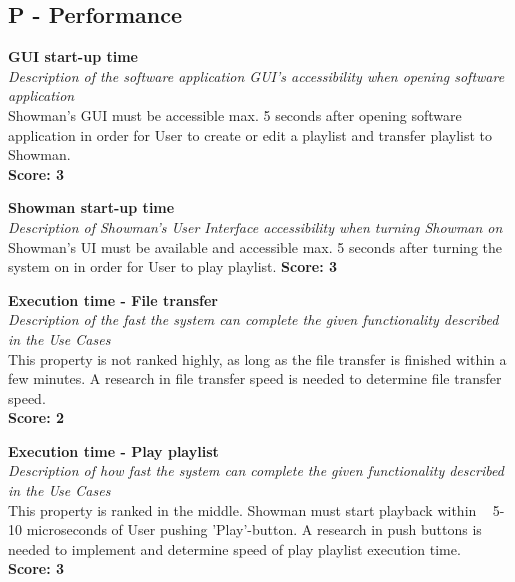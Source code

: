 \subsection{\textbf{P} - Performance}
\textbf{GUI start-up time} \\
\textit{Description of the software application GUI's accessibility when opening software application} \\
Showman's GUI must be accessible max. 5 seconds after opening software application in order for User to create or edit a playlist and transfer playlist to Showman. \\
\textbf{Score: 3} \newline

\textbf{Showman start-up time} \\
\textit{Description of Showman's User Interface accessibility when turning Showman on} \\
Showman's UI must be available and accessible max. 5 seconds after turning the system on in order for User to play playlist. \newline
\textbf{Score: 3} \newline

\textbf{Execution time - File transfer} \\
\textit{Description of the fast the system can complete the given functionality described in the Use Cases} \\
This property is not ranked highly, as long as the file transfer is finished within a few minutes. A research in file transfer speed is needed to determine file transfer speed. \\
\textbf{Score: 2} \newline

\textbf{Execution time - Play playlist} \\
\textit{Description of how fast the system can complete the given functionality described in the Use Cases} \\
This property is ranked in the middle. Showman must start playback within ~ 5-10 microseconds of User pushing 'Play'-button. A research in push buttons is needed to implement and determine speed of play playlist execution time. \\
\textbf{Score: 3} \\

